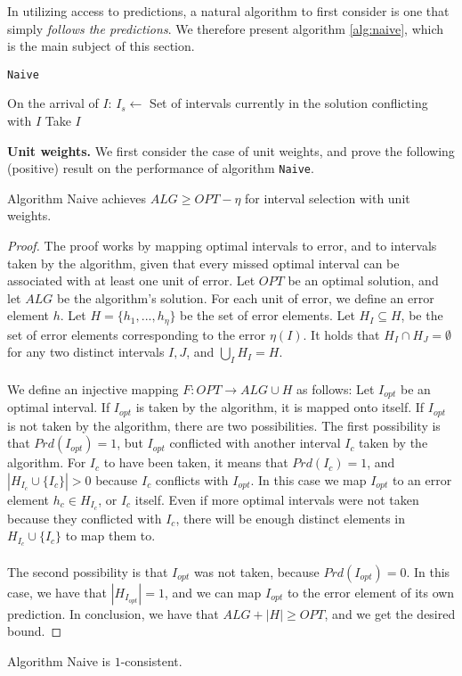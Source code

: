 In utilizing access to predictions, a natural algorithm to first consider is one that simply \textit{follows the predictions}. We therefore present algorithm \ref{alg:naive}, which is the main subject of this section.

\begin{algorithm}
\caption{\texttt{Naive}}\label{alg:naive}
\begin{algorithmic}
\State On the arrival of $I$:
\State $I_{s} \gets $ Set of intervals currently in the solution conflicting with $I$
    \State Take $I$
\EndIf
\end{algorithmic}
\end{algorithm}
\textbf{Unit weights.} We first consider the case of unit weights, and prove the following (positive) result on the performance of algorithm \texttt{Naive}.




\begin{theorem}
    Algorithm Naive achieves $ALG \geq OPT - \eta$ for interval selection with unit weights.
    \label{theo:unw-naive-pos}
\end{theorem}
\begin{proof}
The proof works by mapping optimal intervals to error, and to intervals taken by the algorithm, given that every missed optimal interval can be associated with at least one unit of error. Let $OPT$ be an optimal solution, and let $ALG$ be the algorithm's solution. For each unit of error, we define an error element $h$.
Let $H=\{h_{1},...,h_{\eta}\}$ be the set of error elements. Let $H_{I} \subseteq H$, be the set of error elements corresponding to the error $\eta(I)$. It holds that $H_{I} \cap H_{J} = \emptyset$ for any two distinct intervals $I,J$, and $\bigcup\limits_{I} H_{I} = H$.\\\\
We define an injective mapping $F: OPT \rightarrow ALG \cup H$ as follows: Let $I_{opt}$ be an optimal interval. If $I_{opt}$ is taken by the algorithm, it is mapped onto itself. If $I_{opt}$ is not taken by the algorithm, there are two possibilities. The first possibility is that $Prd(I_{opt}) = 1$, but $I_{opt}$ conflicted with another interval $I_{c}$ taken by the algorithm. For $I_{c}$ to have been taken, it means that $Prd(I_{c}) = 1$, and $|H_{I_{c}} \cup \{I_c\}|>0$ because $I_c$ conflicts with $I_{opt}$. In this case we map $I_{opt}$ to an error element $h_{c}\in H_{I_{c}}$, or $I_c$ itself. Even if more optimal intervals were not taken because they conflicted with $I_{c}$, there will be enough distinct elements in $H_{I_{c}} \cup \{I_c\}$ to map them to.\\\\
The second possibility is that $I_{opt}$ was not taken, because $Prd(I_{opt}) = 0$. In this case, we have that $|H_{I_{opt}}| = 1$, and we can map $I_{opt}$ to the error element of its own prediction. In conclusion, we have that $ALG + |H| \geq OPT$, and we get the desired bound.    
\end{proof}
\begin{corollary}
Algorithm Naive is $1$-consistent.
\end{corollary}

